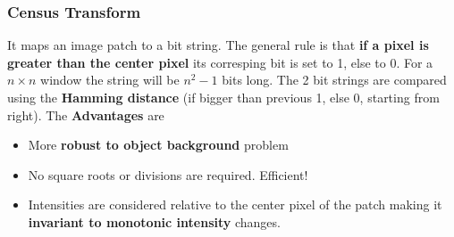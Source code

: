 \documentclass[a4paper,12 pt]{article}
\theoremstyle{definition}
\theoremstyle{remark}
\theoremstyle{definition}
\theoremstyle{definition}
\theoremstyle{definition}
\theoremstyle{remark}
\theoremstyle{definition}
\begin{document}
\subsubsection*{Census Transform}
It maps an image patch to a bit string. The general rule is that \textbf{if a pixel is greater than the center pixel} its corresping bit is set to 1, else to 0. For a $n\times n$ window the string will be $n^2-1$ bits long. The 2 bit strings are compared using the \textbf{Hamming distance} (if bigger than previous 1, else 0, starting from right). The \textbf{Advantages} are
\begin{itemize}
\item More \textbf{robust to object background} problem
\item No square roots or divisions are required. Efficient!
\item Intensities are considered relative to the center pixel of the patch making it \textbf{invariant to monotonic intensity} changes.
\end{itemize}
\end{document}

